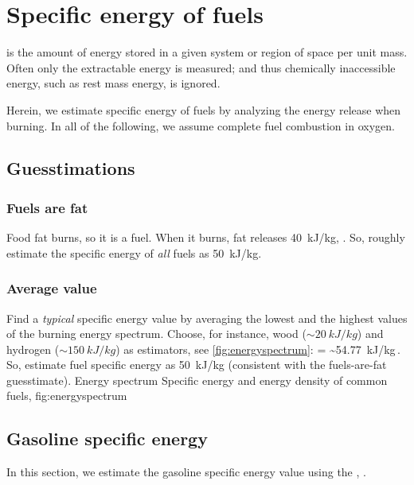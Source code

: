 \chapter*{Specific energy of fuels}
%
 is the amount of energy stored in a given system or region of space per unit mass. Often only the extractable energy is measured; and thus chemically inaccessible energy, such as rest mass energy, is ignored.

Herein, we estimate specific energy of fuels by analyzing the energy release when burning. In all of the following, we assume complete fuel combustion in oxygen.


\section*{Guesstimations}


\subsection*{Fuels are fat}
%
Food fat burns, so it is a fuel. When it burns, fat releases \ca \SI{40}{kJ/kg}, \citep{wiki:foodenergy}. So, roughly estimate the specific energy of \emph{all} fuels as \SI{50}{kJ/kg}.


\subsection*{Average value}
%
Find a \emph{typical} specific energy value by averaging the lowest and the highest values of the burning energy spectrum. Choose, for instance, wood ($\sim\SI{20}{kJ/kg}$) and hydrogen ($\sim\SI{150}{kJ/kg}$) as estimators, see \cref{fig:energyspectrum}:
%
\beq
    \ener =  
          \sim \SI{54.77}{kJ/kg}\,.
\eeq
%
So, estimate fuel specific energy as \SI{50}{kJ/kg} (consistent with the fuels-are-fat guesstimate).
%
%
%
  {Energy spectrum}%
  {Specific energy and energy density of common fuels, \citep{wiki:energyspectrum}}%
  {fig:energyspectrum}%
%
%


\section*{Gasoline specific energy}
%
In this section, we estimate the gasoline specific energy value using the , \citep{weinstein:2008}.

